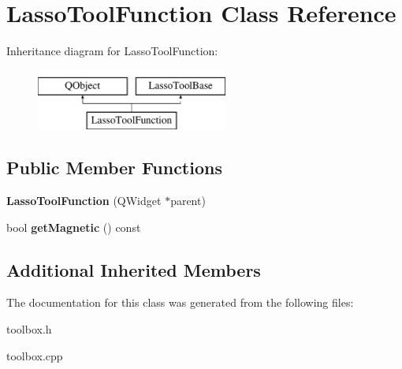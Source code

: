 \hypertarget{class_lasso_tool_function}{\section{Lasso\-Tool\-Function Class Reference}
\label{class_lasso_tool_function}
}
Inheritance diagram for Lasso\-Tool\-Function\-:\begin{figure}[H]
\begin{center}
\leavevmode
\includegraphics[height=2.000000cm]{class_lasso_tool_function}
\end{center}
\end{figure}
\subsection*{Public Member Functions}
\begin{DoxyCompactItemize}
\item 
\hypertarget{class_lasso_tool_function_ae6d52aec5bc8754d26c6eef37c1c6b08}{{\bfseries Lasso\-Tool\-Function} (Q\-Widget $\ast$parent)}\label{class_lasso_tool_function_ae6d52aec5bc8754d26c6eef37c1c6b08}

\item 
\hypertarget{class_lasso_tool_function_a5a463c428829f05f7e621e095073b36a}{bool {\bfseries get\-Magnetic} () const }\label{class_lasso_tool_function_a5a463c428829f05f7e621e095073b36a}

\end{DoxyCompactItemize}
\subsection*{Additional Inherited Members}


The documentation for this class was generated from the following files\-:\begin{DoxyCompactItemize}
\item 
toolbox.\-h\item 
toolbox.\-cpp\end{DoxyCompactItemize}
